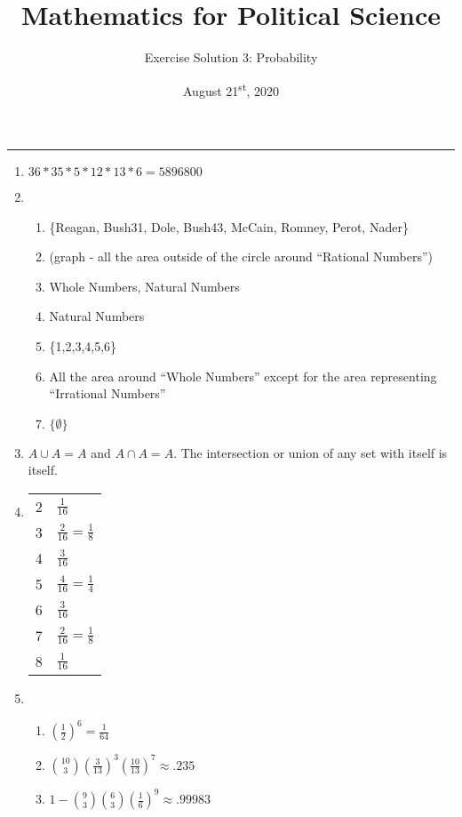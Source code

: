 \documentclass[11pt]{article}
\title{\Large{\bf{\vspace{-100pt}Mathematics for Political Science \vspace{-15pt}}}}
\author{\large{Exercise Solution 3: Probability}}
\date{August 21\textsuperscript{st}, 2020}
\begin{document}
\maketitle

\hrule


\begin{enumerate}

\item 
$36 * 35 * 5 * 12 * 13 * 6 = 5896800$


\item 
\begin{enumerate}
\item \{Reagan, Bush31, Dole, Bush43, McCain, Romney, Perot, Nader\}
\item (graph - all the area outside of the circle around ``Rational Numbers'')
\item Whole Numbers, Natural Numbers
\item Natural Numbers
\item \{1,2,3,4,5,6\}
\item All the area around ``Whole Numbers'' except for the area representing ``Irrational Numbers''
\item $\{\emptyset\}$
\end{enumerate}


\item 
$A \cup A = A$ and $A \cap A = A$.  The intersection or union of any set with itself is itself.


\item 

\begin{small}
\begin{tabular}{c|l}
  & \\ \hline
\rule{0cm}{.5cm} 2 & $\frac{1}{16}$ \\
\rule{0cm}{.5cm} 3 & $\frac{2}{16} = \frac{1}{8}$ \\
\rule{0cm}{.5cm} 4 & $\frac{3}{16}$ \\
\rule{0cm}{.5cm} 5 & $\frac{4}{16} = \frac{1}{4}$ \\
\rule{0cm}{.5cm} 6 & $\frac{3}{16}$ \\
\rule{0cm}{.5cm} 7 & $\frac{2}{16} = \frac{1}{8}$ \\
\rule{0cm}{.5cm} 8 & $\frac{1}{16}$ \\
\end{tabular}
\end{small}


\item 
\begin{enumerate}
\item $\left(\frac{1}{2}\right)^6 = \frac{1}{64}$
\item $\binom{10}{3} \left(\frac{3}{13}\right)^3 \left(\frac{10}{13}\right)^7 \approx .235 $
\item $1 - \binom{9}{3} \binom{6}{3} \left(\frac{1}{6}\right)^9 \approx .99983 $
\end{enumerate}





\end{enumerate}
\end{document}
